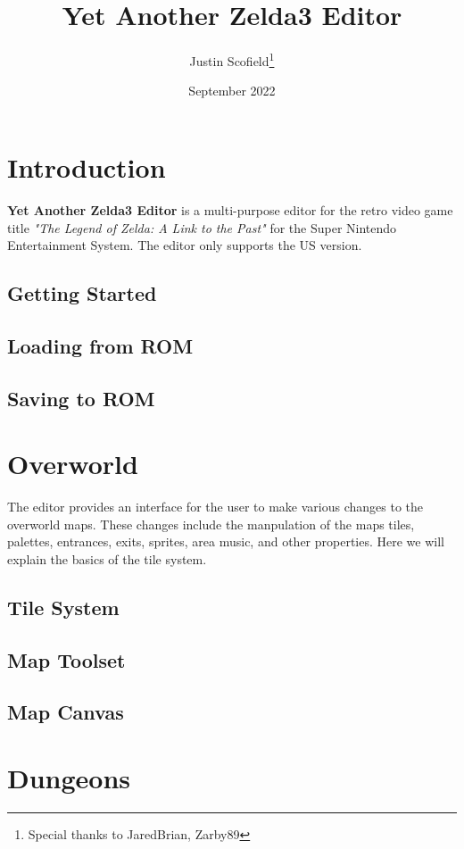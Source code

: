 \documentclass[12pt, oneside]{report}
\title{Yet Another Zelda3 Editor}
\author{Justin Scofield\thanks{Special thanks to JaredBrian, Zarby89}}
\date{September 2022}
\begin{document}
\maketitle

\tableofcontents

\chapter{Introduction}

{\bf Yet Another Zelda3 Editor} is a multi-purpose editor for the retro video game title {\it {"The Legend of Zelda: A Link to the Past"}} for the Super Nintendo Entertainment System. The editor only supports the US version.

\section{Getting Started}
\section{Loading from ROM}
\section{Saving to ROM}

\chapter{Overworld}

  The editor provides an interface for the user to make various changes to the overworld maps. These changes include the manpulation of the maps tiles, palettes, entrances, exits, sprites, area music, and other properties. Here we will explain the basics of the tile system.

  \section{Tile System}
  \section{Map Toolset}
  \section{Map Canvas}

\chapter{Dungeons}
\end{document}
